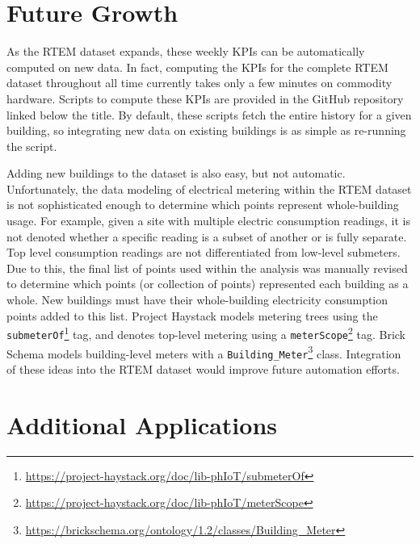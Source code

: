 \documentclass[a4paper]{article}
\begin{document}
\section{Future Growth}

As the RTEM dataset expands, these weekly KPIs can be automatically computed on new data. In fact, computing the KPIs for the complete RTEM dataset throughout all time currently takes only a few minutes on commodity hardware. Scripts to compute these KPIs are provided in the GitHub repository linked below the title. By default, these scripts fetch the entire history for a given building, so integrating new data on existing buildings is as simple as re-running the script.

Adding new buildings to the dataset is also easy, but not automatic. Unfortunately, the data modeling of electrical metering within the RTEM dataset is not sophisticated enough to determine which points represent whole-building usage. For example, given a site with multiple electric consumption readings, it is not denoted whether a specific reading is a subset of another or is fully separate. Top level consumption readings are not differentiated from low-level submeters. Due to this, the final list of points used within the analysis was manually revised to determine which points (or collection of points) represented each building as a whole. New buildings must have their whole-building electricity consumption points added to this list. Project Haystack models metering trees using the \texttt{submeterOf}\footnote{\url{https://project-haystack.org/doc/lib-phIoT/submeterOf}} tag, and denotes top-level metering using a \texttt{meterScope}\footnote{\url{https://project-haystack.org/doc/lib-phIoT/meterScope}} tag. Brick Schema models building-level meters with a \texttt{Building\_Meter}\footnote{\url{https://brickschema.org/ontology/1.2/classes/Building\_Meter}} class. Integration of these ideas into the RTEM dataset would improve future automation efforts.

\section{Additional Applications}
\end{document}
